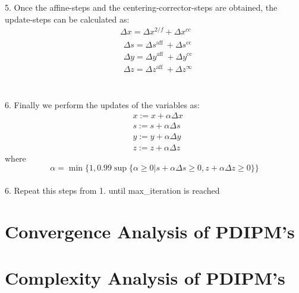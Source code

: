 5. Once the affine-steps and the centering-corrector-steps are obtained, the update-steps can be calculated as:
\begin{equation}
\begin{aligned}
&\Delta x=\Delta x^{2 / f}+\Delta x^{c c}\\
&\begin{array}{l}
\Delta s=\Delta s^{\text {aff }}+\Delta s^{\mathrm{cc}} \\
\Delta y=\Delta y^{\text {aff }}+\Delta y^{\mathrm{cc}} \\
\Delta z=\Delta z^{\text {aff }}+\Delta z^{\infty}
\end{array}
\end{aligned}
\end{equation}\\ \\
6. Finally we perform the updates of the variables as:
\begin{equation}
\begin{aligned}
&x:=x+\alpha \Delta x\\
&s:=s+\alpha \Delta s\\
&y:=y+\alpha \Delta y\\
&z:=z+\alpha \Delta z
\end{aligned}
\end{equation}
\hspace{30pt} where
\begin{equation}
    \alpha=\min \{1,0.99 \sup \{\alpha \geq 0 | s+\alpha \Delta s \geq 0, z+\alpha \Delta z \geq 0\}\}
\end{equation}\\ 
6. Repeat this steps from 1. until max\_iteration is reached

\section{Convergence Analysis of PDIPM's}
\section{Complexity Analysis of PDIPM's}



